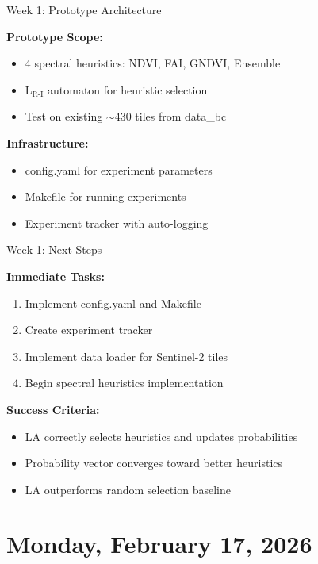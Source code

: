 \documentclass[10pt,xcolor={table,dvipsnames},t]{beamer}
\begin{document}
\begin{frame}{Week 1: Prototype Architecture}

\textbf{Prototype Scope:}
\begin{itemize}
  \item 4 spectral heuristics: NDVI, FAI, GNDVI, Ensemble
  \item L$_{\text{R-I}}$ automaton for heuristic selection
  \item Test on existing $\sim$430 tiles from data\_bc
\end{itemize}

\vspace{0.5em}
\textbf{Infrastructure:}
\begin{itemize}
  \item config.yaml for experiment parameters
  \item Makefile for running experiments
  \item Experiment tracker with auto-logging
\end{itemize}

\end{frame}

\begin{frame}{Week 1: Next Steps}

\textbf{Immediate Tasks:}
\begin{enumerate}
  \item Implement config.yaml and Makefile
  \item Create experiment tracker
  \item Implement data loader for Sentinel-2 tiles
  \item Begin spectral heuristics implementation
\end{enumerate}

\vspace{0.5em}
\textbf{Success Criteria:}
\begin{itemize}
  \item LA correctly selects heuristics and updates probabilities
  \item Probability vector converges toward better heuristics
  \item LA outperforms random selection baseline
\end{itemize}

\end{frame}

\section{Monday, February 17, 2026}
\end{document}
